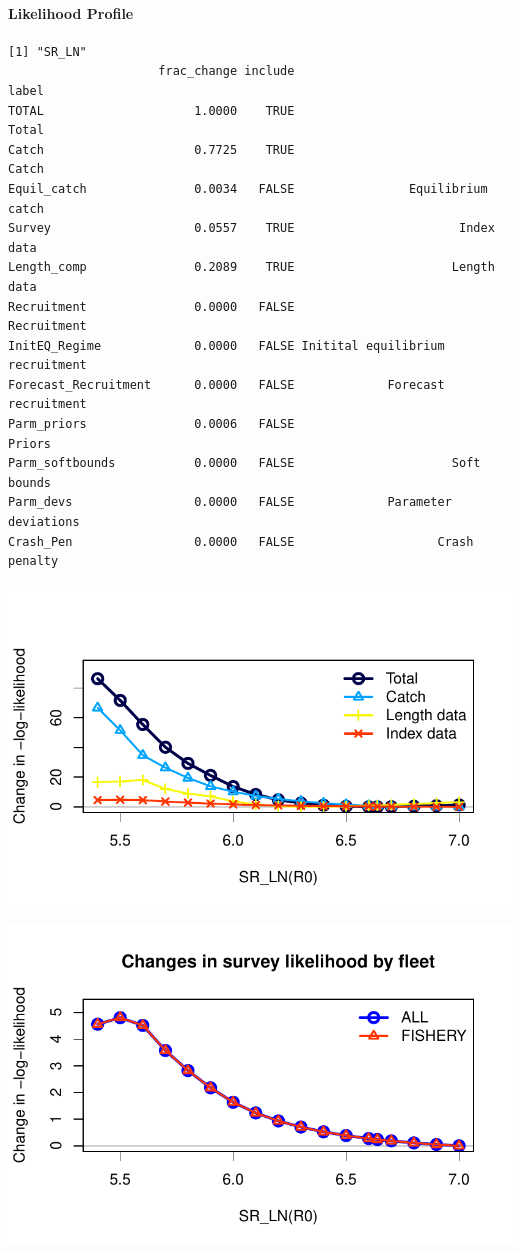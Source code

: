 \documentclass[
  letterpaper,
  DIV=11,
  numbers=noendperiod]{scrartcl}
\let\oldparagraph\paragraph
\renewcommand{\paragraph}[1]{\oldparagraph{#1}\mbox{}}
\begin{document}
\hypertarget{likelihood-profile}{%
\paragraph{Likelihood Profile}\label{likelihood-profile}}

\begin{verbatim}
[1] "SR_LN"
                     frac_change include                            label
TOTAL                     1.0000    TRUE                            Total
Catch                     0.7725    TRUE                            Catch
Equil_catch               0.0034   FALSE                Equilibrium catch
Survey                    0.0557    TRUE                       Index data
Length_comp               0.2089    TRUE                      Length data
Recruitment               0.0000   FALSE                      Recruitment
InitEQ_Regime             0.0000   FALSE Initital equilibrium recruitment
Forecast_Recruitment      0.0000   FALSE             Forecast recruitment
Parm_priors               0.0006   FALSE                           Priors
Parm_softbounds           0.0000   FALSE                      Soft bounds
Parm_devs                 0.0000   FALSE             Parameter deviations
Crash_Pen                 0.0000   FALSE                    Crash penalty
\end{verbatim}

\includegraphics{LUKA_50_Base_model_diags_report_files/figure-pdf/r0prof-1.pdf}

\includegraphics{LUKA_50_Base_model_diags_report_files/figure-pdf/r0prof-2.pdf}
\end{document}
